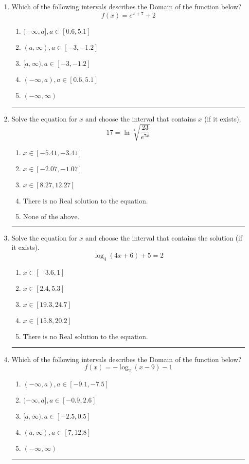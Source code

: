 \documentclass[14pt]{extbook}
\newcommand{\litem}[1]{\item#1\hspace*{-1cm}\rule{\textwidth}{0.4pt}}
\begin{document}
\begin{enumerate}
{\begin{enumerate}[label=\Alph*.]
\end{enumerate} }
\litem{
Which of the following intervals describes the Domain of the function below?\[ f(x) = e^{x+7}+2 \]\begin{enumerate}[label=\Alph*.]
\item \( (-\infty, a], a \in [0.6, 5.1] \)
\item \( (a, \infty), a \in [-3, -1.2] \)
\item \( [a, \infty), a \in [-3, -1.2] \)
\item \( (-\infty, a), a \in [0.6, 5.1] \)
\item \( (-\infty, \infty) \)

\end{enumerate} }
\litem{
 Solve the equation for $x$ and choose the interval that contains $x$ (if it exists).\[  17 = \ln{\sqrt[4]{\frac{23}{e^{7x}}}} \]\begin{enumerate}[label=\Alph*.]
\item \( x \in [-5.41, -3.41] \)
\item \( x \in [-2.07, -1.07] \)
\item \( x \in [8.27, 12.27] \)
\item \( \text{There is no Real solution to the equation.} \)
\item \( \text{None of the above.} \)

\end{enumerate} }
\litem{
Solve the equation for $x$ and choose the interval that contains the solution (if it exists).\[ \log_{4}{(4x+6)}+5 = 2 \]\begin{enumerate}[label=\Alph*.]
\item \( x \in [-3.6, 1] \)
\item \( x \in [2.4, 5.3] \)
\item \( x \in [19.3, 24.7] \)
\item \( x \in [15.8, 20.2] \)
\item \( \text{There is no Real solution to the equation.} \)

\end{enumerate} }
\litem{
Which of the following intervals describes the Domain of the function below?\[ f(x) = -\log_2{(x-9)}-1 \]\begin{enumerate}[label=\Alph*.]
\item \( (-\infty, a), a \in [-9.1, -7.5] \)
\item \( (-\infty, a], a \in [-0.9, 2.6] \)
\item \( [a, \infty), a \in [-2.5, 0.5] \)
\item \( (a, \infty), a \in [7, 12.8] \)
\item \( (-\infty, \infty) \)


\end{enumerate}}
\end{enumerate}
\end{document}
